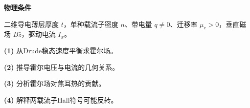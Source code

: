 \textbf{物理条件}\par 二维导电薄层厚度 \(t\)，单种载流子密度 \(n\)、带电量 \(q\ne0\)、迁移率 \(\mu_c>0\)，垂直磁场 \(B\hat z\)，驱动电流 \(I_x\)。
\par\noindent\textbf{(1)} 从Drude稳态速度平衡求霍尔场。
\par\noindent\textbf{(2)} 推导霍尔电压与电流的几何关系。
\par\noindent\textbf{(3)} 分析霍尔场对焦耳热的贡献。
\par\noindent\textbf{(4)} 解释两载流子Hall符号可能反转。
